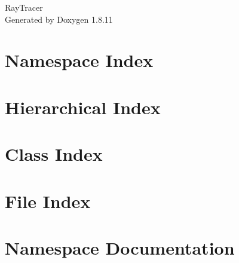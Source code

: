 \documentclass[twoside]{book}
\newcommand{\+}{\discretionary{\mbox{\scriptsize$\hookleftarrow$}}{}{}}
\newcommand{\clearemptydoublepage}{%
  \newpage{\pagestyle{empty}\cleardoublepage}%
}
\begin{document}
\hypersetup{pageanchor=false,
             bookmarksnumbered=true,
             pdfencoding=unicode
            }
\begin{titlepage}
\vspace*{7cm}
\begin{center}%
{\Large Ray\+Tracer }\\
\vspace*{1cm}
{\large Generated by Doxygen 1.8.11}\\
\end{center}
\end{titlepage}
\clearemptydoublepage
\tableofcontents
\clearemptydoublepage
{}
\hypersetup{pageanchor=true}

\chapter{Namespace Index}

\chapter{Hierarchical Index}

\chapter{Class Index}

\chapter{File Index}

\chapter{Namespace Documentation}





\end{document}
